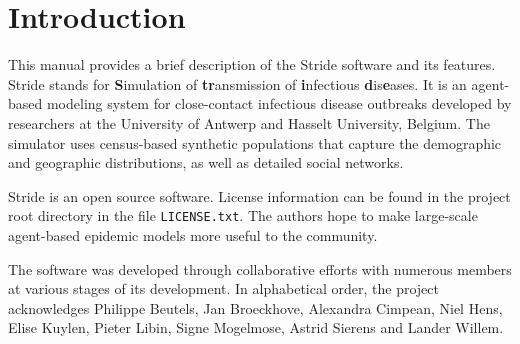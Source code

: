 \chapter{Introduction}
\label{chap:Introduction}
  
This manual provides a brief description of the Stride software and its
features. 
Stride stands for \textbf{S}imulation of \textbf{tr}ansmission 
 of \textbf{i}nfectious \textbf{d}is\textbf{e}ases. It is an agent-based modeling 
system for close-contact infectious disease outbreaks developed by researchers at the
University of Antwerp and Hasselt University, Belgium.
The simulator uses census-based synthetic populations
that capture the demographic and geographic distributions, as well as detailed social networks.

Stride is an open source software. License information can be found in the project root directory in the file \texttt{LICENSE.txt}. The authors hope to make large-scale
agent-based epidemic models more useful to the community.

The software was developed through collaborative efforts with numerous members at various stages of its development. In alphabetical order, the project acknowledges
Philippe Beutels, Jan Broeckhove, Alexandra Cimpean, Niel Hens, Elise Kuylen, Pieter Libin, Signe Mogelmose, Astrid Sierens and Lander Willem.


